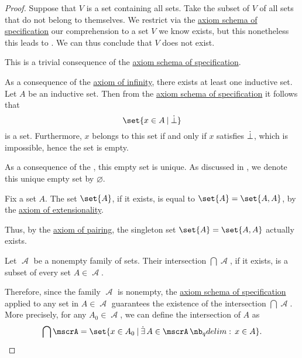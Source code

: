\begin{proof}
   Suppose that \( V \) is a set containing all sets. Take the subset of \( V \) of all sets that do not belong to themselves. We restrict via the \hyperref[def:zfc/specification]{axiom schema of specification} our comprehension to a set \( V \) we know exists, but this nonetheless this leads to . We can thus conclude that \( V \) does not exist.

   This is a trivial consequence of the \hyperref[def:zfc/specification]{axiom schema of specification}.

   As a consequence of the \hyperref[def:zfc/infinity]{axiom of infinity}, there exists at least one inductive set. Let \( A \) be an inductive set. Then from the \hyperref[def:zfc/specification]{axiom schema of specification} it follows that
  \begin{equation*}
    \set{ x \in A \given \synbot }
  \end{equation*}
  is a set. Furthermore, \( x \) belongs to this set if and only if \( x \) satisfies \( \dot\bot \), which is impossible, hence the set is empty.

  As a consequence of the , this empty set is unique. As discussed in , we denote this unique empty set by \( \varnothing \).

   Fix a set \( A \). The set \( \set{A} \), if it exists, is equal to \( \set{A} = \set{A, A} \), by the \hyperref[def:zfc/extensionality]{axiom of extensionality}.

  Thus, by the \hyperref[def:zfc/pairing]{axiom of pairing}, the singleton set \( \set{A} = \set{A, A} \) actually exists.

   Let \( \mscrA \) be a nonempty family of sets. Their intersection \( \bigcap \mscrA \), if it exists, is a subset of every set \( A \in \mscrA \).

  Therefore, since the family \( \mscrA \) is nonempty, the \hyperref[def:zfc/specification]{axiom schema of specification} applied to any set in \( A \in \mscrA \) guarantees the existence of the intersection \( \bigcap \mscrA \). More precisely, for any \( A_0 \in \mscrA \), we can define the intersection of \( A \) as
  \begin{equation*}
    \bigcap \mscrA = \set{ x \in A_0 \given \qexists {A \in \mscrA} x \in A }.
  \end{equation*}


\end{proof}
